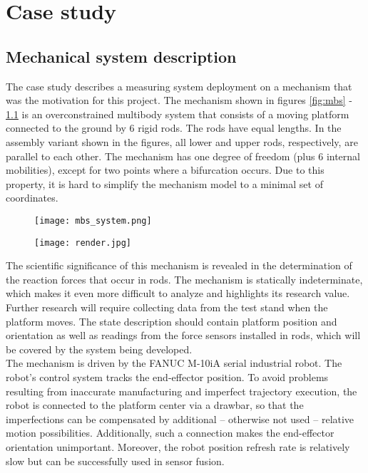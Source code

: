 \chapter{Case study}

\section{Mechanical system description}

The case study describes a measuring system deployment on a mechanism that was the motivation for this project. The mechanism shown in figures \ref{fig:mbs} - \ref{fig:render} is an overconstrained multibody system \cite{bib:BPAS2012} that consists of a moving platform connected to the ground by 6 rigid rods. The rods have equal lengths. In the assembly variant shown in the figures, all lower and upper rods, respectively, are parallel to each other. The mechanism has one degree of freedom (plus 6 internal mobilities), except for two points where a bifurcation occurs. Due to this property, it is hard to simplify the mechanism model to a minimal set of coordinates.

\begin{figure}[!h]
	\centering
	\begin{minipage}{.5\textwidth}
		\centering
		\texttt{[image: mbs\_system.png]}
		\label{fig:mbs}
	\end{minipage}%
	\begin{minipage}{.5\textwidth}
		\centering
		\texttt{[image: render.jpg]}
		\label{fig:render}
	\end{minipage}
\end{figure}

The scientific significance of this mechanism is revealed in the determination of the reaction forces that occur in rods. The mechanism is statically indeterminate, which makes it even more difficult to analyze and highlights its research value. Further research will require collecting data from the test stand when the platform moves. The state description should contain platform position and orientation as well as readings from the force sensors installed in rods, which will be covered by the system being developed.\\

The mechanism is driven by the FANUC M-10iA serial industrial robot. The robot’s control system tracks the end-effector position. To avoid problems resulting from inaccurate manufacturing and imperfect trajectory execution, the robot is connected to the platform center via a drawbar, so that the imperfections can be compensated by additional -- otherwise not used -- relative motion possibilities. Additionally, such a connection makes the end-effector orientation unimportant. Moreover, the robot position refresh rate is relatively slow but can be successfully used in sensor fusion.\\

